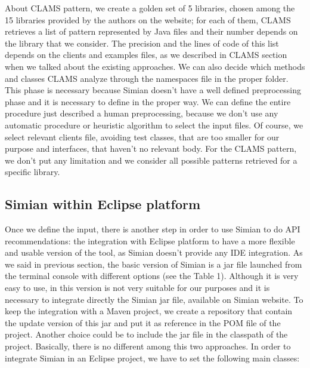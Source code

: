 About CLAMS pattern, we create a golden set of 5 libraries, chosen among the 15 libraries provided by the authors on the website; for each of them, CLAMS retrieves a list of pattern represented by Java files and their number depends on the library that we consider. The precision and the lines of code of this list depends on the clients and examples files, as we described in CLAMS section when we talked about the existing approaches. We can also decide which methods and classes CLAMS analyze through the namespaces file in the proper folder. This phase is necessary because Simian doesn't have a well defined preprocessing phase and it is necessary to define in the proper way. We can define the entire procedure just described a human preprocessing, because we don't use any automatic procedure or heuristic algorithm to select the input files. Of course, we select relevant clients file, avoiding test classes, that are too smaller for our purpose and interfaces, that haven't no relevant body. For the CLAMS pattern, we don't put any limitation and we consider all possible patterns retrieved for a specific library.


\subsection{Simian within Eclipse platform}
Once we define the input, there is another step in order to use Simian to do API recommendations: the integration with Eclipse platform to have a more flexible and usable version of the tool, as Simian doesn't provide any IDE integration. As we said in previous section, the basic version of Simian is a jar file launched from the terminal console with different options (see the Table 1). Although it is very easy to use, in this version is not very suitable for our purposes and it is necessary to integrate directly the Simian jar file, available on Simian website. To keep the integration with a Maven project, we create a repository that contain the update version of this jar and put it as reference in the POM file of the project. Another choice could be to include the jar file in the classpath of the project. Basically, there is no different among this two approaches.
In order to integrate Simian in an Eclipse project, we have to set the following main classes: 

